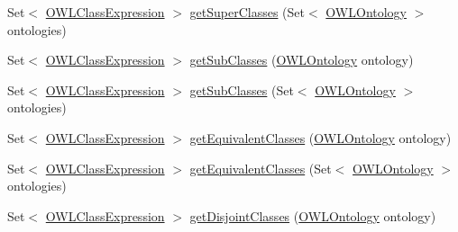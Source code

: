 \begin{DoxyCompactItemize}
\item 
Set$<$ \hyperlink{interfaceorg_1_1semanticweb_1_1owlapi_1_1model_1_1_o_w_l_class_expression}{O\-W\-L\-Class\-Expression} $>$ \hyperlink{classuk_1_1ac_1_1manchester_1_1cs_1_1owl_1_1owlapi_1_1_o_w_l_class_impl_a3c155c604509b4d2e64da19d7ac88367}{get\-Super\-Classes} (Set$<$ \hyperlink{interfaceorg_1_1semanticweb_1_1owlapi_1_1model_1_1_o_w_l_ontology}{O\-W\-L\-Ontology} $>$ ontologies)
\item 
Set$<$ \hyperlink{interfaceorg_1_1semanticweb_1_1owlapi_1_1model_1_1_o_w_l_class_expression}{O\-W\-L\-Class\-Expression} $>$ \hyperlink{classuk_1_1ac_1_1manchester_1_1cs_1_1owl_1_1owlapi_1_1_o_w_l_class_impl_ad78d2820f3cbf8a6f6bc12e79bc63621}{get\-Sub\-Classes} (\hyperlink{interfaceorg_1_1semanticweb_1_1owlapi_1_1model_1_1_o_w_l_ontology}{O\-W\-L\-Ontology} ontology)
\item 
Set$<$ \hyperlink{interfaceorg_1_1semanticweb_1_1owlapi_1_1model_1_1_o_w_l_class_expression}{O\-W\-L\-Class\-Expression} $>$ \hyperlink{classuk_1_1ac_1_1manchester_1_1cs_1_1owl_1_1owlapi_1_1_o_w_l_class_impl_a42f424edfa19820acc21311aed03ea20}{get\-Sub\-Classes} (Set$<$ \hyperlink{interfaceorg_1_1semanticweb_1_1owlapi_1_1model_1_1_o_w_l_ontology}{O\-W\-L\-Ontology} $>$ ontologies)
\item 
Set$<$ \hyperlink{interfaceorg_1_1semanticweb_1_1owlapi_1_1model_1_1_o_w_l_class_expression}{O\-W\-L\-Class\-Expression} $>$ \hyperlink{classuk_1_1ac_1_1manchester_1_1cs_1_1owl_1_1owlapi_1_1_o_w_l_class_impl_ad92f1d855e3a9c06bea46384b30429ad}{get\-Equivalent\-Classes} (\hyperlink{interfaceorg_1_1semanticweb_1_1owlapi_1_1model_1_1_o_w_l_ontology}{O\-W\-L\-Ontology} ontology)
\item 
Set$<$ \hyperlink{interfaceorg_1_1semanticweb_1_1owlapi_1_1model_1_1_o_w_l_class_expression}{O\-W\-L\-Class\-Expression} $>$ \hyperlink{classuk_1_1ac_1_1manchester_1_1cs_1_1owl_1_1owlapi_1_1_o_w_l_class_impl_a62e89dfd39de9941bcc8a72ea933b581}{get\-Equivalent\-Classes} (Set$<$ \hyperlink{interfaceorg_1_1semanticweb_1_1owlapi_1_1model_1_1_o_w_l_ontology}{O\-W\-L\-Ontology} $>$ ontologies)
\item 
Set$<$ \hyperlink{interfaceorg_1_1semanticweb_1_1owlapi_1_1model_1_1_o_w_l_class_expression}{O\-W\-L\-Class\-Expression} $>$ \hyperlink{classuk_1_1ac_1_1manchester_1_1cs_1_1owl_1_1owlapi_1_1_o_w_l_class_impl_a52a9341ad114d5b33b3e34fd4fea3e57}{get\-Disjoint\-Classes} (\hyperlink{interfaceorg_1_1semanticweb_1_1owlapi_1_1model_1_1_o_w_l_ontology}{O\-W\-L\-Ontology} ontology)
\item 

\end{DoxyCompactItemize}

